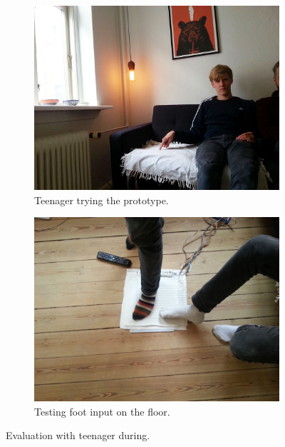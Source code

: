 \begin{figure}[t]
    \begin{subfigure}[t]{0.44\textwidth}
        \centering
        \includegraphics[width=\textwidth]{figures/touch/evaluation/sebastian/sofa_infront_seb}
        \caption{Teenager trying the prototype.}
        \label{fig:textiletouch:eval:sebastian:sofa_front}
    \end{subfigure}%
    \hspace{0.02\textwidth}
    \begin{subfigure}[t]{0.44\textwidth}
        \centering
        \includegraphics[width=\textwidth]{figures/touch/evaluation/sebastian/feet}
        \caption{Testing foot input on the floor.}
        \label{fig:textiletouch:eval:sebastian:feet}
    \end{subfigure}
    \caption{Evaluation with teenager during.}
    \label{fig:textiletouch:eval:sebastian}
\end{figure}

